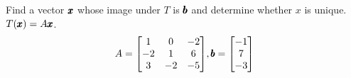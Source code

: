 \documentclass{../mathhomework}
\newenvironment{Mat}{\begin{bmatrix}}{\end{bmatrix}}
\begin{document}
\begin{problem}[1.8\#3]
    Find a vector $\pmb{x}$ whose image under $T$ is $\pmb{b}$ and determine whether $x$ is unique. $T(\pmb{x}) = A\pmb{x}$.
    \begin{equation*}
        A = \begin{Mat}
            1 & 0 & -2 \\
            -2 & 1 & 6 \\
            3 & -2 & -5
        \end{Mat},
        \Vect{b} = \begin{Mat}
            -1 \\ 7 \\ -3
        \end{Mat}
    \end{equation*}


\end{problem}
\end{document}
